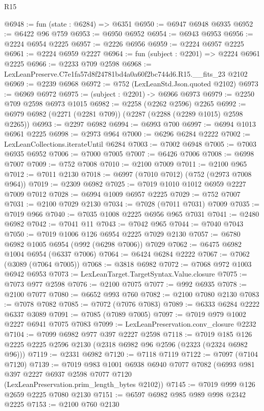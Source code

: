 \begin{lexlean}{R15}
\begin{coremodule}
@6948 := fun (state : @6284) => @6351
@6950 := @6947 @6948 @6935
@6952 := @6422 @96 @759
@6953 := @6950 @6952
@6954 := @6943 @6953
@6956 := @2224 @6954 @2225
@6957 := @2226 @6956
@6959 := @2224 @6957 @2225
@6961 := @2224 @6959 @2227
@6964 := fun (subject : @2201) => @2224 @6961 @2225
@6966 := @2233 @709 @2598
@6968 := LexLeanPreserve.C7e1fa57d8f24781bd4a0a60f2bc744d6.R15.__fits_23 @2102
@6969 := @2239 @6968
@6972 := @752 (LexLeanStd.Json.quoted @2102)
@6973 := @6969 @6972
@6975 := (subject : @2201) -> @6966 @6973
@6979 := @2250 @709 @2598 @6973 @1015
@6982 := @2258 (@2262 @2596) @2265
@6992 := @6979 @6982 (@2271 (@2281 @709)) (@2287 (@2288 (@2289 @1015) @2598 @2265))
@6993 := @2297 @6982
@6994 := @6993 @700
@6997 := @6994 @1013 @6961 @2225
@6998 := @2973 @964
@7000 := @6296 @6284 @2222
@7002 := LexLeanCollections.iterateUntil @6284
@7003 := @7002 @6948
@7005 := @7003 @6935 @6952
@7006 := @7000 @7005
@7007 := @6426 @7006
@7008 := @6998 @7007
@7009 := @752 @7008
@7010 := @2100 @7009
@7011 := @2100 @965
@7012 := @7011 @2130
@7018 := @6997 (@7010 @7012) (@752 (@2973 @7008 @964))
@7019 := @2309 @6982
@7025 := @7019 @1010 @1012 @6959 @2227 @7009 @7012
@7028 := @6994 @1009 @6957 @2225
@7029 := @752 @7007
@7031 := @2100 @7029 @2130
@7034 := @7028 (@7011 @7031) @7009
@7035 := @7019 @966
@7040 := @7035 @1008 @2225 @6956 @965 @7031
@7041 := @2480 @6982
@7042 := @7041 @11
@7043 := @7042 @965
@7044 := @7040 @7043
@7050 := @7019 @1006 @126 @6954 @2225 @7029 @2130
@7057 := @6780 @6982 @1005 @6954 (@992 (@6298 @7006)) @7029
@7062 := @6475 @6982 @1004 @6954 (@6337 @7006)
@7064 := @6424 @6284 @2222
@7067 := @7062 (@3089 (@7064 @7005))
@7068 := @3818 @6982
@7072 := @7068 @972 @1003 @6942 @6953
@7073 := LexLeanTarget.TargetSyntax.Value.closure
@7075 := @7073 @977 @2598
@7076 := @2100 @7075
@7077 := @992 @6935
@7078 := @2100 @7077
@7080 := @6652 @993 @760
@7082 := @2100 @7080 @2130
@7083 := @7078 @7082
@7085 := @7072 (@7076 @7083)
@7089 := @6333 @6284 @2222 @6337 @3089
@7091 := @7085 (@7089 @7005)
@7097 := @7019 @979 @1002 @2227 @6941 @7075 @7083
@7099 := LexLeanPreservation.conv_closure @2232
@7104 := @7099 @6982 @977 @397 @2227 @2598
@7118 := @7019 @185 @126 @2225 @2225 @2596 @2130 (@2318 @6982 @96 @2596 (@2323 (@2324 @6982 @96)))
@7119 := @2331 @6982
@7120 := @7118 @7119
@7122 := @7097 (@7104 @7120)
@7139 := @7019
    @983
    @1001
    @6938
    @6940
    @7077
    @7082
    (@6993 @981 @397 @2227 @6937 @2598 @7077 @7120 (LexLeanPreservation.prim_length_bytes @2102))
@7145 := @7019 @999 @126 @2659 @2225 @7080 @2130
@7151 := @6597 @6982 @985 @989 @998 @2342 @2225
@7153 := @2100 @760 @2130

\end{coremodule}
\end{lexlean}

